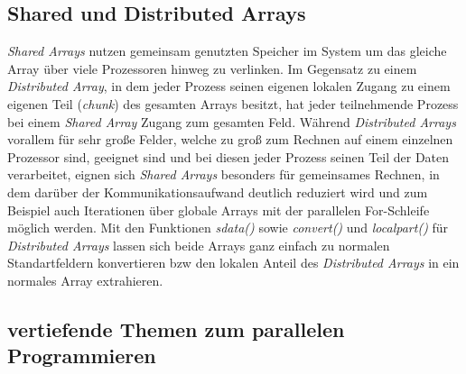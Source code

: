 \documentclass[proseminar,german,utf8]{zihpub}
\begin{document}
\subsection{Shared und Distributed Arrays}

\textit{Shared Arrays} nutzen gemeinsam genutzten Speicher im System um das gleiche Array über viele Prozessoren hinweg zu verlinken. Im Gegensatz zu einem \textit{Distributed Array}, in dem jeder Prozess seinen eigenen lokalen Zugang zu einem eigenen Teil (\textit{chunk}) des gesamten Arrays besitzt, hat jeder teilnehmende Prozess bei einem \textit{Shared Array} Zugang zum gesamten Feld. Während \textit{Distributed Arrays} vorallem für sehr große Felder, welche zu groß zum Rechnen auf einem einzelnen Prozessor sind, geeignet sind und bei diesen jeder Prozess seinen Teil der Daten verarbeitet, eignen sich \textit{Shared Arrays} besonders für gemeinsames Rechnen, in dem darüber der Kommunikationsaufwand deutlich reduziert wird und zum Beispiel auch Iterationen über globale Arrays mit der parallelen For-Schleife möglich werden. Mit den Funktionen \textit{sdata()} sowie \textit{convert()} und \textit{localpart()} für \textit{Distributed Arrays} lassen sich beide Arrays ganz einfach zu normalen Standartfeldern konvertieren bzw den lokalen Anteil des\textit{ Distributed Arrays} in ein normales Array extrahieren. 

\subsection{vertiefende Themen zum parallelen Programmieren}
\end{document}

